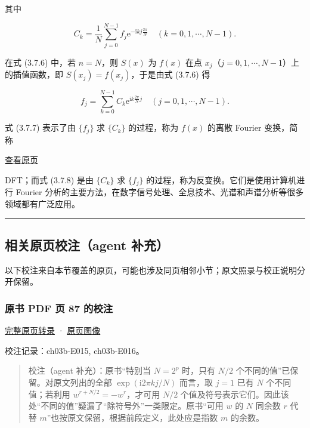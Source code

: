 \documentclass[
  10pt,
  fontset=fandol]{ctexart}
\begin{document}
其中

\[
C_k=\frac1N\sum_{j=0}^{N-1}f_j\mathrm e^{-\mathrm ikj\frac{2\pi}{N}}\quad(k=0,1,\cdots,N-1).\tag{3.7.7}
\]

在式 (3.7.6) 中，若 \(n=N\)，则 \(S(x)\) 为 \(f(x)\) 在点 \(x_j\)（\(j=0,1,\cdots,N-1\)）上的插值函数，即 \(S(x_j)=f(x_j)\)，于是由式 (3.7.6) 得

\[
f_j=\sum_{k=0}^{N-1}C_k\mathrm e^{\mathrm ik\frac{2\pi}{N}j}\quad(j=0,1,\cdots,N-1).\tag{3.7.8}
\]

式 (3.7.7) 表示了由 \(\{f_j\}\) 求 \(\{C_k\}\) 的过程，称为 \(f(x)\) 的离散 Fourier 变换，简称

\href{../../source-images/pdf-087.jpeg}{查看原页}

DFT；而式 (3.7.8) 是由 \(\{C_k\}\) 求 \(\{f_j\}\) 的过程，称为反变换。它们是使用计算机进行 Fourier 分析的主要方法，在数字信号处理、全息技术、光谱和声谱分析等很多领域都有广泛应用。

\begin{center}\rule{0.5\linewidth}{0.5pt}\end{center}

\subsection{相关原页校注（agent 补充）}\label{ux76f8ux5173ux539fux9875ux6821ux6ce8agent-ux8865ux5145}

以下校注来自本节覆盖的原页，可能也涉及同页相邻小节；原文照录与校正说明分开保留。

\subsubsection{原书 PDF 页 87 的校注}\label{ux539fux4e66-pdf-ux9875-87-ux7684ux6821ux6ce8}

\href{../pages/pdf-087.md}{完整原页转录} · \href{../../source-images/pdf-087.jpeg}{原页图像}

校注记录：ch03b-E015, ch03b-E016。

\begin{quote}
校注（agent 补充）：原书``特别当 \(N=2^p\) 时，只有 \(N/2\) 个不同的值''已保留。对原文列出的全部 \(\exp(\mathrm i2\pi kj/N)\) 而言，取 \(j=1\) 已有 \(N\) 个不同值；若利用 \(w^{r+N/2}=-w^r\)，才可用 \(N/2\) 个值及符号表示它们。因此该处``不同的值''疑漏了``除符号外''一类限定。原书``可用 \(w\) 的 \(N\) 同余数 \(r\) 代替 \(m\)''也按原文保留，根据前段定义，此处应是指数 \(m\) 的余数。
\end{quote}
\end{document}
